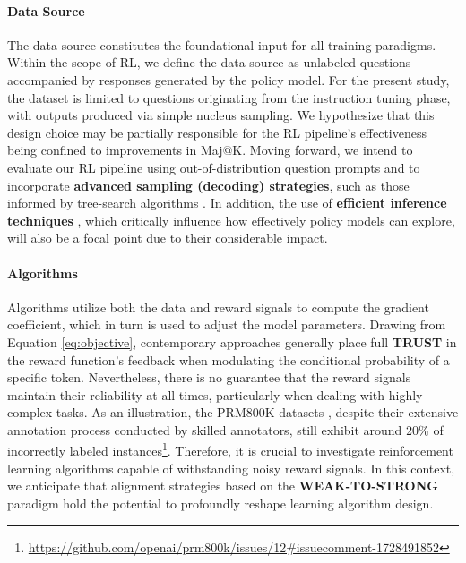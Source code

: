 \begin{itemize}[topsep=0pt]
\begin{itemize}[topsep=0pt]
\paragraph{Data Source} The data source constitutes the foundational input for all training paradigms. Within the scope of RL, we define the data source as unlabeled questions accompanied by responses generated by the policy model. For the present study, the dataset is limited to questions originating from the instruction tuning phase, with outputs produced via simple nucleus sampling. We hypothesize that this design choice may be partially responsible for the RL pipeline's effectiveness being confined to improvements in Maj@K. Moving forward, we intend to evaluate our RL pipeline using out-of-distribution question prompts and to incorporate \textbf{advanced sampling (decoding) strategies}, such as those informed by tree-search algorithms \citep{yao2023tree}. In addition, the use of \textbf{efficient inference techniques} \citep{xia-etal-2023-speculative,leviathan2023fast,kwon2023efficient,xia2024unlocking}, which critically influence how effectively policy models can explore, will also be a focal point due to their considerable impact.

\paragraph{Algorithms} Algorithms utilize both the data and reward signals to compute the gradient coefficient, which in turn is used to adjust the model parameters. Drawing from Equation \ref{eq:objective}, contemporary approaches generally place full \textbf{TRUST} in the reward function's feedback when modulating the conditional probability of a specific token. Nevertheless, there is no guarantee that the reward signals maintain their reliability at all times, particularly when dealing with highly complex tasks. As an illustration, the PRM800K datasets \citep{lightman2023let}, despite their extensive annotation process conducted by skilled annotators, still exhibit around 20\% of incorrectly labeled instances\footnote{\url{https://github.com/openai/prm800k/issues/12\#issuecomment-1728491852}}. Therefore, it is crucial to investigate reinforcement learning algorithms capable of withstanding noisy reward signals. In this context, we anticipate that alignment strategies based on the \textbf{WEAK-TO-STRONG} paradigm \citep{burns2023weak} hold the potential to profoundly reshape learning algorithm design.


\end{itemize}
\end{itemize}
